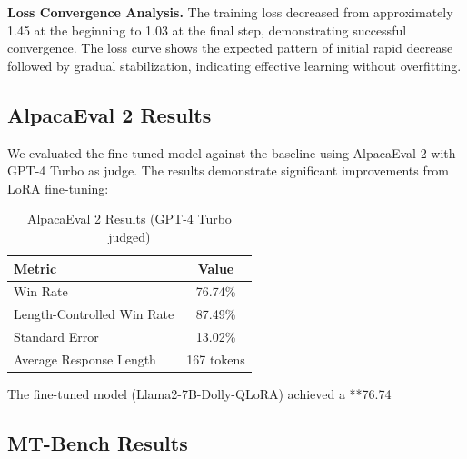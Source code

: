 \documentclass{assignment7_report}
\begin{document}
\textbf{Loss Convergence Analysis.} The training loss decreased from approximately 1.45 at the beginning to 1.03 at the final step, demonstrating successful convergence. The loss curve shows the expected pattern of initial rapid decrease followed by gradual stabilization, indicating effective learning without overfitting.


\subsection{AlpacaEval 2 Results}

We evaluated the fine-tuned model against the baseline using AlpacaEval 2 with GPT-4 Turbo as judge. The results demonstrate significant improvements from LoRA fine-tuning:

\begin{table}[h!]
\centering
\caption{AlpacaEval 2 Results (GPT-4 Turbo judged)}
\label{tab:alpaca_eval_results}
\begin{tabular}{@{}lc@{}}
\toprule
\textbf{Metric} & \textbf{Value} \\ \midrule
Win Rate & 76.74\% \\
Length-Controlled Win Rate & 87.49\% \\
Standard Error & 13.02\% \\
Average Response Length & 167 tokens \\ \bottomrule
\end{tabular}
\end{table}

The fine-tuned model (Llama2-7B-Dolly-QLoRA) achieved a **76.74%

\subsection{MT-Bench Results}
\end{document}
